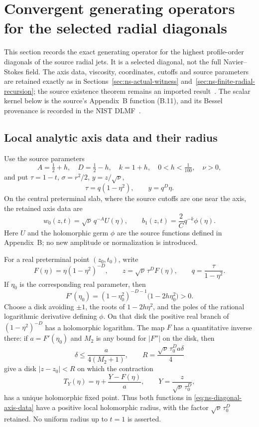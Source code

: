 \section{Convergent generating operators for the selected radial diagonals}
\label{sec:ns-diagonal-generator}

This section records the exact generating operator for the highest profile-order
diagonals of the source radial jets.  It is a selected diagonal, not the full
Navier--Stokes field.  The axis data, viscosity, coordinates, cutoffs and
source parameters are retained exactly as in Sections~\ref{sec:ns-actual-witness}
and~\ref{sec:ns-finite-radial-recursion}; the source existence theorem remains
an imported result~\cite{openaiNS2026release}.  The scalar kernel below is the
source's Appendix~B function (B.11), and its Bessel provenance is recorded in
the NIST DLMF~\cite[\S10.2,\S10.9]{olverDLMF2}.

\subsection{Local analytic axis data and their radius}

Use the source parameters
\[
 A=\tfrac12+h,\quad D=\tfrac12-h,\quad k=1+h,\quad 0<h<\tfrac1{100},
 \quad \nu>0,
\]
and put $\tau=1-t$, $\sigma=r^2/2$, $y=z/\sqrt\nu$,
\[
  \tau=q(1-\eta^2),\quad\quad y=q^D\eta.
\]
On the central preterminal slab, where the source cutoffs are one near the
axis, the retained axis data are
\begin{equation}\label{eq:ns-diagonal-axis-data}
 w_0(z,t)=\sqrt\nu\,q^{-A}U(\eta),\qquad
 b_1(z,t)=\frac{2}{C}q^{-k}\phi(\eta).
\end{equation}
Here $U$ and the holomorphic germ $\phi$ are the source functions defined in
Appendix~B; no new amplitude or normalization is introduced.

For a real preterminal point $(z_0,t_0)$, write
\[
 F(\eta)=\eta(1-\eta^2)^{-D},\qquad
 z=\sqrt\nu\,\tau^D F(\eta),\qquad q=\frac{\tau}{1-\eta^2}.
\]
If $\eta_0$ is the corresponding real parameter, then
\[
 F'(\eta_0)=(1-\eta_0^2)^{-D-1}
 \bigl(1-2h\eta_0^2\bigr)>0.
\]
Choose a disk avoiding $\pm1$, the roots of $1-2h\eta^2$, and the poles of
the rational logarithmic derivative defining $\phi$.  On that disk the
positive real branch of $(1-\eta^2)^{-D}$ has a holomorphic logarithm.  The
map $F$ has a quantitative inverse there: if $a=F'(\eta_0)$ and $M_2$ is
any bound for $|F''|$ on the disk, then
\[
  \delta\leq \frac{a}{4(M_2+1)},\quad\quad
 R=\frac{\sqrt\nu\,\tau_0^D a\delta}{4}
\]
give a disk $|z-z_0|<R$ on which the contraction
\[
 T_Y(\eta)=\eta+\frac{Y-F(\eta)}a,\quad\quad
 Y=\frac{z}{\sqrt\nu\,\tau_0^D},
\]
has a unique holomorphic fixed point.  Thus both functions in
\eqref{eq:ns-diagonal-axis-data} have a positive local holomorphic radius,
with the factor $\sqrt\nu\,\tau_0^D$ retained.  No uniform radius up to
$t=1$ is asserted.

